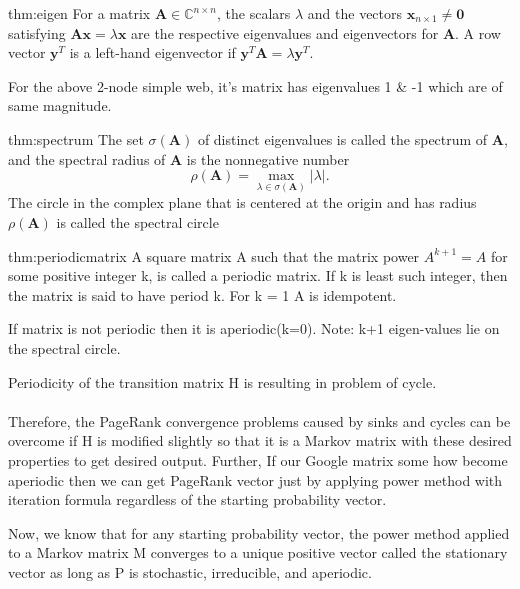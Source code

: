 \begin{thm}{thm:eigen}
	For a matrix $\mathbf{A} \in \mathbb{C}^{n \times n}$, the scalars $\lambda$ and the vectors $\mathbf{x}_{n \times 1} \neq \mathbf{0}$ satisfying $\mathbf{A x}=\lambda \mathbf{x}$ are the respective eigenvalues and eigenvectors for $\mathbf{A}$. A row vector $\mathbf{y}^{T}$ is a left-hand eigenvector if $\mathbf{y}^{T} \mathbf{A}=\lambda \mathbf{y}^{T}$.
\end{thm}

\noindent For the above 2-node simple web, it's matrix has eigenvalues 1 \& -1 which are of same magnitude.
\begin{thm}{thm:spectrum}
	\noindent The set $\sigma(\mathbf{A})$ of distinct eigenvalues is called the spectrum of $\mathbf{A}$, and the spectral radius of $\mathbf{A}$ is the nonnegative number
    $$
	\rho(\mathbf{A})=\max _{\lambda \in \sigma(\mathbf{A})}|\lambda| .
	$$
	\noindent The circle in the complex plane that is centered at the origin and has radius $\rho(\mathbf{A})$ is called the spectral circle
\end{thm}
	
\begin{thm}{thm:periodicmatrix}
	\noindent A square matrix A such that the matrix power $A^{k+1} = A$ for some positive integer k, is called a periodic matrix. If k is least such integer, then the matrix is said to have period k. For k = 1 A is idempotent.
\end{thm}

\noindent If matrix is not periodic then it is aperiodic(k=0).
Note: k+1 eigen-values lie on the spectral circle.
	
\noindent Periodicity of the transition matrix H is resulting in problem of cycle.\\
\\
\noindent Therefore, the PageRank convergence problems caused by sinks and cycles can be overcome if H is modified slightly so that it is a Markov matrix with these desired properties to get desired output. Further, If our Google matrix some how become aperiodic then we can get PageRank vector just by applying power method with iteration formula regardless of the starting probability vector.

\noindent Now, we know that for any starting probability vector, the power method applied to a Markov matrix M converges to a unique positive vector called the stationary vector as long as P is stochastic, irreducible, and aperiodic.

